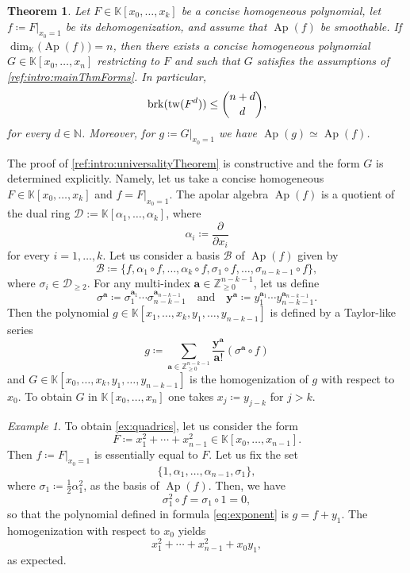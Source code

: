 \documentclass[a4paper,11pt,reqno]{amsart}
\newcommand{\bfa}{\mathbf{a}}
\newcommand{\bfy}{\mathbf{y}}
\newcommand{\calB}{\mathcal{B}}
\newcommand{\calD}{\mathcal{D}}
\newcommand{\bbK}{\mathbb{K}}
\newcommand{\bbN}{\mathbb{N}}
\DeclareMathOperator{\Ap}{Ap}
\DeclareMathOperator{\brk}{brk}
\numberwithin{equation}{section}
\theoremstyle{definition}
\theoremstyle{plain}
\newtheorem{teo}[defn]{Theorem}
\theoremstyle{remark}
\newtheorem{exam}[defn]{Example}
\begin{document}
\begin{teo}\label{ref:intro:universalityTheorem}
    Let $F\in \bbK[x_0, \ldots ,x_k]$ be a concise homogeneous polynomial, let
    $f\coloneq F|_{x_0=1}$ be its dehomogenization, and assume that $\Ap(f)$
    be smoothable. If $\dim_{\bbK} \bigl(\Ap(f)\bigr)=n$, then there exists a concise
    homogeneous polynomial $G\in \bbK[x_0, \ldots ,x_n]$ restricting to
    $F$ and such that $G$ satisfies the assumptions of
    \autoref{ref:intro:mainThmForms}. In particular,
    \[
        \brk(\twist{F^d})\leq\binom{n+d}{d},
    \]
    for every $d\in\bbN$.
    Moreover, for $g\coloneq G|_{x_0=1}$ we have $\Ap(g) \simeq
    \Ap(f)$.
\end{teo}
The proof of \autoref{ref:intro:universalityTheorem} is constructive and the form $G$
is determined explicitly. Namely, let us
take a concise homogeneous $F\in \bbK[x_0,  \ldots ,x_k]$ and $f = F|_{x_0=1}$. The apolar
algebra $\Ap(f)$ is a quotient of the dual ring $\calD := \bbK[\alpha_1, \ldots
,\alpha_k]$, where
\[\alpha_i\coloneq\frac{\partial}{\partial x_i}\]
for every $i=1,\dots,k$.
Let us consider a basis $\calB$ of $\Ap(f)$ given by
\[
\calB\coloneq\{ f, \alpha_1\circ f, \ldots, \alpha_k \circ f, \sigma_{1}\circ f, \ldots ,\sigma_{n-k-1}\circ f \},
\]
where $\sigma_i\in \calD_{\geq 2}$.
For any multi-index $\bfa\in \mathbb{Z}_{\geq 0}^{n-k-1}$, let us define
\[\sigma^{\bfa} \coloneq \sigma_1^{\bfa_1} \cdots
    \sigma_{n-k-1}^{\bfa_{n-k-1}}\quad\mbox{and}\quad \bfy^{\bfa} \coloneq y_1^{\bfa_1} \cdots
y_{n-k-1}^{\bfa_{n-k-1}}.\]
Then the polynomial $g\in \bbK[x_1, \ldots ,x_k, y_{1}, \ldots ,y_{n-k-1}]$ is defined by a
Taylor-like series
\begin{equation}\label{eq:exponent}
        g\coloneq \sum_{\bfa\in \mathbb{Z}_{\geq 0}^{n-k-1}} \frac{\bfy^{\bfa}}{\bfa!}(\sigma^{\bfa}\circ f)
\end{equation}
and $G\in \bbK[x_0, \ldots ,x_k, y_1, \ldots ,y_{n-k-1}]$ is the
homogenization of $g$ with respect to $x_0$. To obtain $G$ in $\bbK[x_0, \ldots
,x_n]$ one takes $x_j \coloneq y_{j-k}$ for $j > k$.
\begin{exam}
    To obtain \autoref{ex:quadrics}, let us consider the form
    \[F \coloneq x_1^2 +  \cdots + x_{n-1}^2\in
    \bbK[x_0, \ldots ,x_{n-1}].
    \]
    Then $f \coloneq F|_{x_0=1}$ is essentially equal to
    $F$. Let us fix the set
    \[
    \{1, \alpha_1, \ldots,\alpha_{n-1}, \sigma_1\},
    \]
    where $\sigma_1 \coloneq \frac{1}{2}\alpha_1^2$,
    as the basis of $\Ap(f)$. Then, we have \[
    \sigma_1^2\circ f = \sigma_1 \circ 1 = 0,\]
    so that the polynomial defined in formula \eqref{eq:exponent} is $g=f + y_1$. The homogenization with respect to
    $x_0$ yields \[ x_1^2 +  \cdots + x_{n-1}^2 + x_0y_1,\] as expected.
\end{exam}
\end{document}
